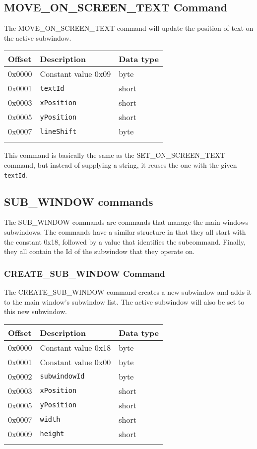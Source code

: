 \documentclass{article}
\newcommand{\field}[1]{\textcolor{fieldColor}{\texttt{#1}}}
\newenvironment{bytelisting}
{\ttfamily \begin{center} \begin{tabular}{l l l} Offset & Description & Data type \\ \hline}
{\normalfont \end{tabular} \end{center}}
\begin{document}
\subsection{MOVE\_ON\_SCREEN\_TEXT Command}
The MOVE\_ON\_SCREEN\_TEXT command will update the position of text on the active subwindow.

\begin{bytelisting}
0x0000 & Constant value 0x09 & byte \\
0x0001 & \field{textId} & short \\
0x0003 & \field{xPosition} & short \\
0x0005 & \field{yPosition} & short \\
0x0007 & \field{lineShift} & byte \\
\end{bytelisting}

This command is basically the same as the SET\_ON\_SCREEN\_TEXT command, but instead of supplying a string, it reuses the one with the given \field{textId}.

\subsection{SUB\_WINDOW commands}
The SUB\_WINDOW commands are commands that manage the main windows subwindows. The commands have a similar structure in that they all start with the constant 0x18, followed by a value that identifies
the subcommand. Finally, they all contain the Id of the subwindow that they operate on.

\subsubsection{CREATE\_SUB\_WINDOW Command}
The CREATE\_SUB\_WINDOW command creates a new subwindow and adds it to the main window's subwindow list. The active subwindow will also be set to this new subwindow.

\begin{bytelisting}
0x0000 & Constant value 0x18 & byte \\
0x0001 & Constant value 0x00 & byte \\
0x0002 & \field{subwindowId} & byte \\
0x0003 & \field{xPosition} & short \\
0x0005 & \field{yPosition} & short \\
0x0007 & \field{width} & short \\
0x0009 & \field{height} & short \\
\end{bytelisting}
\end{document}
